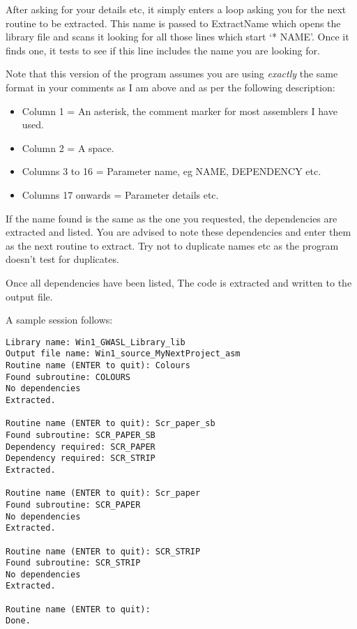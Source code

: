 After asking for your details etc, it simply enters a loop asking
      you for the next routine to be extracted. This name is passed to
      ExtractName which opens the library file and scans it looking for all
      those lines which start `* NAME'. Once it finds one, it tests to see if
      this line includes the name you are looking for.

Note that this version of the program assumes you are using
      \emph{exactly} the same format in your comments as I am above and as per the
      following description:
\begin{itemize}[itemsep=0pt]

\item{}Column 1 = An asterisk, the comment marker for most assemblers
          I have used.

\item{}Column 2 = A space.


\item{}Columns 3 to 16 = Parameter name, eg NAME, DEPENDENCY
          etc.      

\item{}Columns 17 onwards = Parameter details etc.

\end{itemize}

If the name found is the same as the one you requested, the
      dependencies are extracted and listed. You are advised to note these
      dependencies and enter them as the next routine to extract. Try not to
      duplicate names etc as the program doesn't test for duplicates.

Once all dependencies have been listed, The code is extracted and
      written to the output file.

A sample session follows:

\begin{lstlisting}[firstnumber=1,frame=none,numbers=none]
Library name: Win1_GWASL_Library_lib
Output file name: Win1_source_MyNextProject_asm
Routine name (ENTER to quit): Colours
Found subroutine: COLOURS
No dependencies
Extracted.

Routine name (ENTER to quit): Scr_paper_sb
Found subroutine: SCR_PAPER_SB
Dependency required: SCR_PAPER
Dependency required: SCR_STRIP
Extracted.

Routine name (ENTER to quit): Scr_paper
Found subroutine: SCR_PAPER
No dependencies
Extracted.

Routine name (ENTER to quit): SCR_STRIP
Found subroutine: SCR_STRIP
No dependencies
Extracted.

Routine name (ENTER to quit):
Done.
\end{lstlisting}

